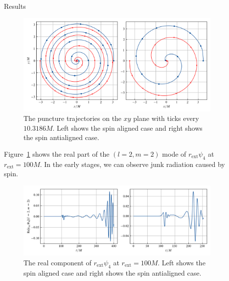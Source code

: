\documentclass[noamssymb]{beamer}
\newlength{\sepwidth}
\newlength{\colwidth}
\newcommand{\separatorcolumn}{\begin{column}{\sepwidth}\end{column}}
\begin{document}
\begin{frame}[t]
\begin{columns}[t]
\begin{column}{\colwidth}
\begin{block}{Results}
	\begin{figure}
		\centering
		\includegraphics[width=\columnwidth]{img/traj}
		\caption{The puncture trajectories on the $xy$ plane with ticks every $10.3186M$. Left shows the spin aligned case and right shows the spin antialigned case.}
	\end{figure}
	
	Figure~\ref{fig:rerpsi4} shows the real part of the $(l=2,m=2)$ mode of $r_\mathrm{ext}\psi_4$ at $r_\mathrm{ext}=100M$. In the early stages, we can observe junk radiation caused by spin.
    \begin{figure}
      \centering
      \label{fig:rerpsi4}
      \includegraphics[width=\columnwidth]{img/Rerpsi4}
      \caption{The real component of $r_\mathrm{ext}\psi_4$ at $r_\mathrm{ext}=100M$. Left shows the spin aligned case and right shows the spin antialigned case.}
    \end{figure}
    
    

  \end{block}


\end{column}

\separatorcolumn

\begin{column}{\colwidth}

  \begin{block}{}
  	

\end{block}
\end{column}
\end{columns}
\end{frame}
\end{document}
